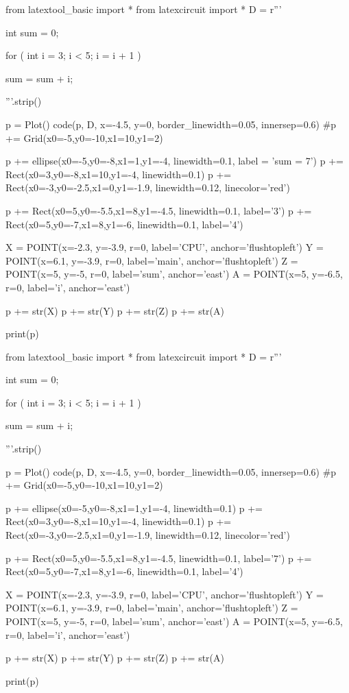 \begin{python}
from latextool_basic import *
from latexcircuit import *
D = r'''



int sum = 0;

    for ( int i = 3;     i < 5;     i = i + 1 )


        sum = sum + i;



'''.strip()

p = Plot()
code(p, D, x=-4.5, y=0, border_linewidth=0.05, innersep=0.6)
#p += Grid(x0=-5,y0=-10,x1=10,y1=2)

p += ellipse(x0=-5,y0=-8,x1=1,y1=-4, linewidth=0.1, label = 'sum = 7')
p += Rect(x0=3,y0=-8,x1=10,y1=-4, linewidth=0.1)
p += Rect(x0=-3,y0=-2.5,x1=0,y1=-1.9, linewidth=0.12, linecolor='red')

p += Rect(x0=5,y0=-5.5,x1=8,y1=-4.5, linewidth=0.1, label='3')
p += Rect(x0=5,y0=-7,x1=8,y1=-6, linewidth=0.1, label='4')

X = POINT(x=-2.3, y=-3.9, r=0, label='CPU', anchor='flushtopleft')
Y = POINT(x=6.1, y=-3.9, r=0, label='main', anchor='flushtopleft')
Z = POINT(x=5, y=-5, r=0, label='sum', anchor='east')
A = POINT(x=5, y=-6.5, r=0, label='i', anchor='east')

p += str(X)
p += str(Y)
p += str(Z)
p += str(A)

print(p)
\end{python}

\begin{python}
from latextool_basic import *
from latexcircuit import *
D = r'''



int sum = 0;

    for ( int i = 3;     i < 5;     i = i + 1 )


        sum = sum + i;



'''.strip()

p = Plot()
code(p, D, x=-4.5, y=0, border_linewidth=0.05, innersep=0.6)
#p += Grid(x0=-5,y0=-10,x1=10,y1=2)

p += ellipse(x0=-5,y0=-8,x1=1,y1=-4, linewidth=0.1)
p += Rect(x0=3,y0=-8,x1=10,y1=-4, linewidth=0.1)
p += Rect(x0=-3,y0=-2.5,x1=0,y1=-1.9, linewidth=0.12, linecolor='red')

p += Rect(x0=5,y0=-5.5,x1=8,y1=-4.5, linewidth=0.1, label='7')
p += Rect(x0=5,y0=-7,x1=8,y1=-6, linewidth=0.1, label='4')

X = POINT(x=-2.3, y=-3.9, r=0, label='CPU', anchor='flushtopleft')
Y = POINT(x=6.1, y=-3.9, r=0, label='main', anchor='flushtopleft')
Z = POINT(x=5, y=-5, r=0, label='sum', anchor='east')
A = POINT(x=5, y=-6.5, r=0, label='i', anchor='east')

p += str(X)
p += str(Y)
p += str(Z)
p += str(A)

print(p)
\end{python}

